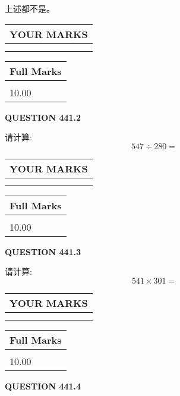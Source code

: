 \documentclass{ctexart}
\begin{document}
 
 上述都不是。
 
 
  
\vspace{0.2in}
  
\noindent\begin{tabular}{|l|}
\hline
 YOUR MARKS  \\
\hline
 \\ 
 \\ 
\hline
\end{tabular}
\hspace{0.05in} \begin{tabular}{|l|}
\hline
 Full Marks  \\
\hline
 \\ 
10.00 \\
\hline
\end{tabular}
{\textbf{\Large{QUESTION
441.2 
}}}
  
  
 
请计算:
\begin{equation}
547  \div    %
280 = \nonumber
\end{equation}
 

 

 
  
\vspace{0.2in}
  
\noindent\begin{tabular}{|l|}
\hline
 YOUR MARKS  \\
\hline
 \\ 
 \\ 
\hline
\end{tabular}
\hspace{0.05in} \begin{tabular}{|l|}
\hline
 Full Marks  \\
\hline
 \\ 
10.00 \\
\hline
\end{tabular}
{\textbf{\Large{QUESTION
441.3 
}}}
  
  
 
请计算:
\begin{equation}
541  \times    %
301 = \nonumber
\end{equation}
 

 

 
  
\vspace{0.2in}
  
\noindent\begin{tabular}{|l|}
\hline
 YOUR MARKS  \\
\hline
 \\ 
 \\ 
\hline
\end{tabular}
\hspace{0.05in} \begin{tabular}{|l|}
\hline
 Full Marks  \\
\hline
 \\ 
10.00 \\
\hline
\end{tabular}
{\textbf{\Large{QUESTION
441.4 
}}}
  
\end{document}
